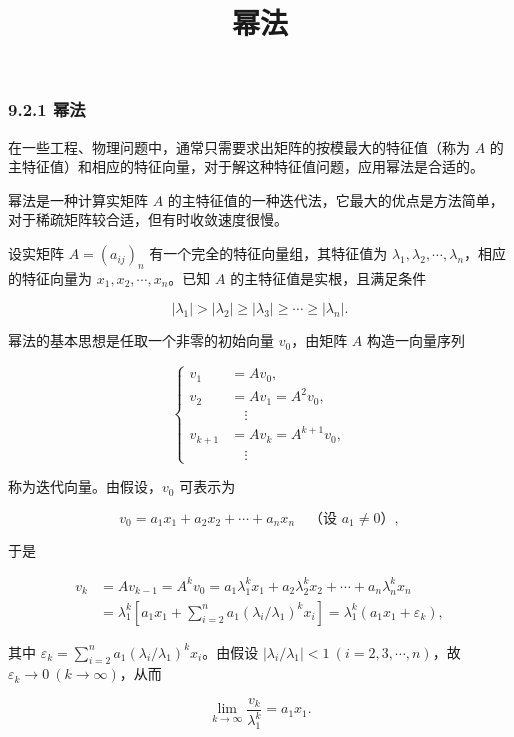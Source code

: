 \documentclass[
  10pt,
  fontset=fandol]{ctexart}
\title{幂法}
\author{}
\date{}
\begin{document}
\maketitle

\subsubsection{9.2.1 幂法}\label{ux5e42ux6cd5}

在一些工程、物理问题中，通常只需要求出矩阵的按模最大的特征值（称为 \(A\) 的主特征值）和相应的特征向量，对于解这种特征值问题，应用幂法是合适的。

幂法是一种计算实矩阵 \(A\) 的主特征值的一种迭代法，它最大的优点是方法简单，对于稀疏矩阵较合适，但有时收敛速度很慢。

设实矩阵 \(A=(a_{ij})_n\) 有一个完全的特征向量组，其特征值为 \(\lambda_1,\lambda_2,\cdots,\lambda_n\)，相应的特征向量为 \(x_1,x_2,\cdots,x_n\)。已知 \(A\) 的主特征值是实根，且满足条件

\[
|\lambda_1|>|\lambda_2|\geq|\lambda_3|\geq\cdots\geq|\lambda_n|.
\tag{9.2.1}
\]

幂法的基本思想是任取一个非零的初始向量 \(v_0\)，由矩阵 \(A\) 构造一向量序列

\[
\left\{
\begin{aligned}
v_1&=Av_0,\\
v_2&=Av_1=A^2v_0,\\
&\quad\vdots\\
v_{k+1}&=Av_k=A^{k+1}v_0,\\
&\quad\vdots
\end{aligned}
\right.
\tag{9.2.2}
\]

称为迭代向量。由假设，\(v_0\) 可表示为

\[
v_0=a_1x_1+a_2x_2+\cdots+a_nx_n\quad\text{（设 }a_1\ne0\text{）},
\tag{9.2.3}
\]

于是

\[
\begin{aligned}
v_k&=Av_{k-1}=A^kv_0=a_1\lambda_1^kx_1+a_2\lambda_2^kx_2+\cdots+a_n\lambda_n^kx_n\\
&=\lambda_1^k\left[a_1x_1+\sum_{i=2}^na_1(\lambda_i/\lambda_1)^kx_i\right]=\lambda_1^k(a_1x_1+\varepsilon_k),
\end{aligned}
\]

其中 \(\varepsilon_k=\displaystyle\sum_{i=2}^na_1(\lambda_i/\lambda_1)^kx_i\)。由假设 \(|\lambda_i/\lambda_1|<1\ (i=2,3,\cdots,n)\)，故 \(\varepsilon_k\to0\ (k\to\infty)\)，从而

\[
\lim_{k\to\infty}\frac{v_k}{\lambda_1^k}=a_1x_1.
\tag{9.2.4}
\]
\end{document}
